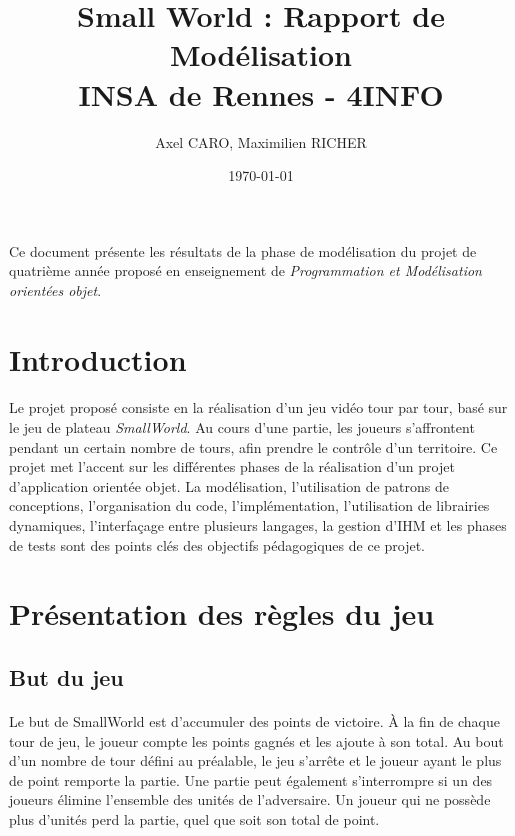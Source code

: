 \documentclass[a4paper]{article}
\title{Small World : Rapport de Modélisation \\ INSA de Rennes - 4INFO}
\author{Axel CARO, Maximilien RICHER}
\date{\today}
\begin{document}
\maketitle

\paragraph{}
Ce document présente les résultats de la phase de modélisation du projet de quatrième année proposé en enseignement de \textit{Programmation et Modélisation orientées objet}.
\\
\tableofcontents

\newpage

\section*{Introduction}
\paragraph{}
Le projet proposé consiste en la réalisation d'un jeu vidéo tour par tour, basé sur le jeu de plateau \textit{SmallWorld}. Au cours d'une partie, les joueurs s'affrontent pendant un certain nombre de tours, afin prendre le contrôle d'un territoire. Ce projet met l'accent sur les différentes phases de la réalisation d'un projet d'application orientée objet. La modélisation, l'utilisation de patrons de conceptions, l'organisation du code, l'implémentation, l'utilisation de librairies dynamiques, l'interfaçage entre plusieurs langages, la gestion d'IHM et les phases de tests sont des points clés des objectifs pédagogiques de ce projet.

\section{Présentation des règles du jeu}

\subsection{But du jeu}
\paragraph{}
Le but de SmallWorld est d'accumuler des points de victoire.
À la fin de chaque tour de jeu, le joueur compte les points gagnés et les ajoute à son total. Au bout d'un nombre de tour défini au préalable, le jeu s'arrête et le joueur ayant le plus de point remporte la partie. Une partie peut également s'interrompre si un des joueurs élimine l'ensemble des unités de l'adversaire. Un joueur qui ne possède plus d'unités perd la partie, quel que soit son total de point.
\end{document}
